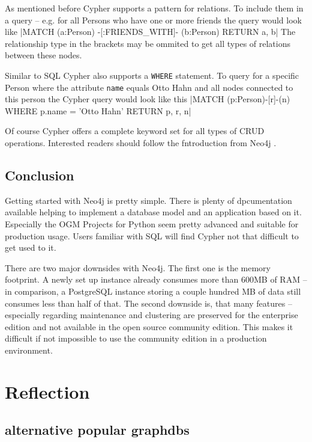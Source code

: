 As mentioned before Cypher supports a pattern for relations.
To include them in a query -- e.g. for all Persons who have one or more friends the query would look like |MATCH (a:Person) -[:FRIENDS_WITH]- (b:Person) RETURN a, b|
The relationship type in the brackets may be ommited to get all types of relations between these nodes.

Similar to SQL Cypher also supports a \texttt{WHERE} statement.
To query for a specific Person where the attribute \texttt{name} equals \glqq Otto Hahn\grqq{} and all nodes connected to this person the Cypher query would look like this |MATCH (p:Person)-[r]-(n) WHERE p.name = 'Otto Hahn' RETURN p, r, n|

Of course Cypher offers a complete keyword set for all types of CRUD operations. Interested readers should follow the fntroduction from Neo4j \autocite{neo4j:cypher_introduction}.

\subsection{Conclusion}
Getting started with Neo4j is pretty simple.
There is plenty of dpcumentation available helping to implement a database model and an application based on it.
Especially the OGM Projects for Python seem pretty advanced and suitable for production usage.
Users familiar with SQL will find Cypher not that difficult to get used to it.

There are two major downsides with Neo4j. The first one is the memory footprint.
A newly set up instance already consumes more than 600MB of RAM -- in comparison, a PostgreSQL instance storing a couple hundred MB of data still consumes less than half of that.
The second downside is, that many features -- especially regarding maintenance and clustering are preserved for the enterprise edition and not available in the open source community edition. This makes it difficult if not impossible to use the community edition in a production environment.

\section{Reflection}
\subsection{alternative popular graphdbs}
